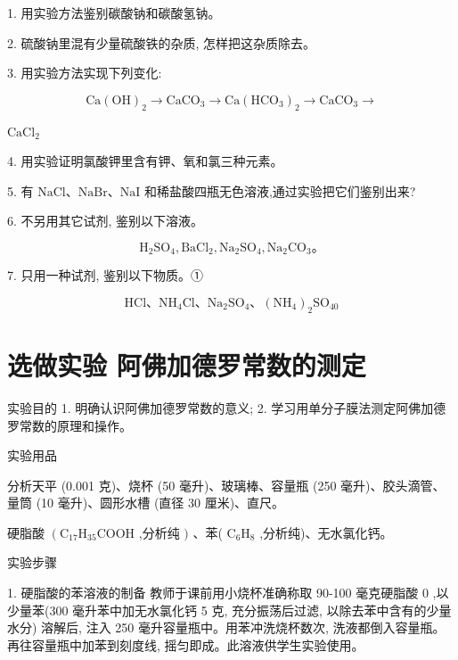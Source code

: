 \documentclass[10pt]{article}
\newcommand{\customfootnote}[1]{
  \let\thefootnote\relax\footnotetext{#1}
}
\begin{document}
1. 用实验方法鉴别碳酸钠和碳酸氢钠。

2. 硫酸钠里混有少量硫酸铁的杂质, 怎样把这杂质除去。

3. 用实验方法实现下列变化:

\[
\mathrm{{Ca}}{\left( \mathrm{{OH}}\right) }_{2} \rightarrow {\mathrm{{CaCO}}}_{3} \rightarrow \mathrm{{Ca}}{\left( {\mathrm{{HCO}}}_{3}\right) }_{2} \rightarrow {\mathrm{{CaCO}}}_{3} \rightarrow
\]

\({\mathrm{{CaCl}}}_{2}\)

4. 用实验证明氯酸钾里含有钾、氧和氯三种元素。

5. 有 \(\mathrm{{NaCl}}\text{、}\mathrm{{NaBr}}\text{、}\mathrm{{NaI}}\) 和稀盐酸四瓶无色溶液,通过实验把它们鉴别出来?

6. 不另用其它试剂, 鉴别以下溶液。

\[
{\mathrm{H}}_{2}{\mathrm{{SO}}}_{4},{\mathrm{{BaCl}}}_{2},{\mathrm{{Na}}}_{2}{\mathrm{{SO}}}_{4},{\mathrm{{Na}}}_{2}{\mathrm{{CO}}}_{3}\text{。}
\]

7. 只用一种试剂, 鉴别以下物质。①

\[
\mathrm{{HCl}}\text{、}{\mathrm{{NH}}}_{4}\mathrm{{Cl}}\text{、}{\mathrm{{Na}}}_{2}{\mathrm{{SO}}}_{4}\text{、}{\left( {\mathrm{{NH}}}_{4}\right) }_{2}{\mathrm{{SO}}}_{40}
\]

\customfootnote{

① 此题可根据情况选做。

}

\section*{选做实验 阿佛加德罗常数的测定}

实验目的 1. 明确认识阿佛加德罗常数的意义; 2. 学习用单分子膜法测定阿佛加德罗常数的原理和操作。

实验用品

分析天平 (0.001 克)、烧杯 (50 毫升)、玻璃棒、容量瓶 (250 毫升)、胶头滴管、量筒 (10 毫升)、圆形水槽 (直径 30 厘米)、直尺。

硬脂酸 \(\left( {{\mathrm{C}}_{17}{\mathrm{H}}_{35}\mathrm{{COOH}}}\right.\) ,分析纯 \()\) 、苯( \({\mathrm{C}}_{6}{\mathrm{H}}_{8}\) ,分析纯)、无水氯化钙。

实验步骤

1. 硬脂酸的苯溶液的制备 教师于课前用小烧杯准确称取 90-100 毫克硬脂酸 \(0\) ,以少量苯(300 毫升苯中加无水氯化钙 5 克, 充分振荡后过滤, 以除去苯中含有的少量水分) 溶解后, 注入 250 毫升容量瓶中。用苯冲洗烧杯数次, 洗液都倒入容量瓶。再往容量瓶中加苯到刻度线, 摇匀即成。此溶液供学生实验使用。
\end{document}
